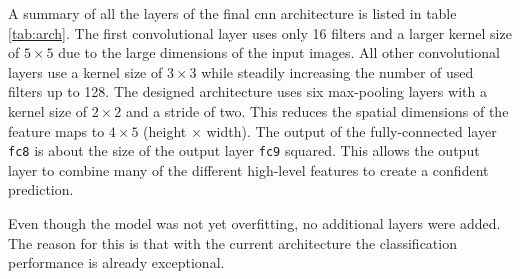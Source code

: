 A summary of all the layers of the final \acrshort{cnn} architecture is listed in table \ref{tab:arch}.
The first convolutional layer uses only \num{16} filters and a larger kernel size of $5\times 5$ due to the large dimensions of the input images.
All other convolutional layers use a kernel size of $3\times 3$ while steadily increasing the number of used filters up to \num{128}.
The designed architecture uses six max-pooling layers with a kernel size of $2\times 2$ and a stride of two.
This reduces the spatial dimensions of the feature maps to $4\times 5$ (height $\times$ width).
The output of the fully-connected layer \texttt{fc8} is about the size of the output layer \texttt{fc9} squared.
This allows the output layer to combine many of the different high-level features to create a confident prediction.

Even though the model was not yet overfitting, no additional layers were added.
The reason for this is that with the current architecture the classification performance is already exceptional.

